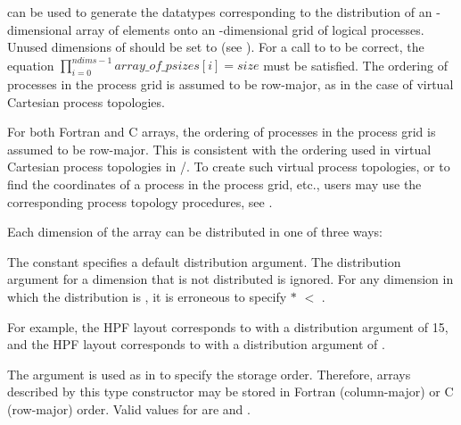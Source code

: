 can be used to generate
the datatypes corresponding to the distribution
of an -dimensional array of  elements
onto
an -dimensional grid of logical processes.
Unused dimensions of  should be set to 
(see ).
For a call to  to be correct,
the equation \( \prod_{i=0}^{ndims-1} array\_of\_psizes[i] = size \)
must be satisfied.
The ordering of processes in the process grid is assumed to be
row-major, as in the case of virtual Cartesian process topologies.
\begin{users}
For both Fortran and C arrays, the ordering of processes in the
process grid is assumed to be row-major. This is consistent with the
ordering used in virtual Cartesian process topologies in
\MPI/.
To create such virtual process topologies, or to find the coordinates
of a process in the process grid, etc., users may use the corresponding
process topology procedures,
see .
\end{users}

Each dimension of the array
can be
distributed in one of three ways:
\begin{constlist}
\end{constlist}

The constant  specifies
a default distribution argument.
The distribution argument for a dimension that is not distributed
is ignored.
For any dimension
in which the distribution
is ,
it is erroneous
to specify
 $*$ 
$<$ .

For example, the HPF layout 
corresponds to 
with a distribution argument of 15, and the HPF layout \gb{}
corresponds to
 with a distribution argument of
.

The  argument is used as in  to
specify the storage order.
Therefore, arrays described by this type constructor may be
stored in Fortran (column-major) or C (row-major) order.
Valid values for  are
 and .

